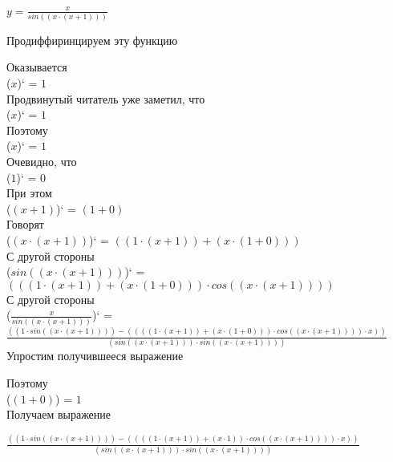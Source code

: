 \documentclass[12pt,a4paper,fleqn]{article}
\begin{document}
$y = $$\frac{x}{sin((x \cdot (x + 1)))}$

 Продиффиринцируем эту функцию

Оказывается\\
($x$)` = $1$\\
Продвинутый читатель уже заметил, что\\
($x$)` = $1$\\
Поэтому\\
($x$)` = $1$\\
Очевидно, что\\
($1$)` = $0$\\
При этом\\
($(x + 1)$)` = $(1 + 0)$\\
Говорят\\
($(x \cdot (x + 1))$)` = $((1 \cdot (x + 1)) + (x \cdot (1 + 0)))$\\
С другой стороны\\
($sin((x \cdot (x + 1)))$)` = $(((1 \cdot (x + 1)) + (x \cdot (1 + 0))) \cdot cos((x \cdot (x + 1))))$\\
С другой стороны\\
($\frac{x}{sin((x \cdot (x + 1)))}$)` = $\frac{((1 \cdot sin((x \cdot (x + 1)))) - ((((1 \cdot (x + 1)) + (x \cdot (1 + 0))) \cdot cos((x \cdot (x + 1)))) \cdot x))}{(sin((x \cdot (x + 1))) \cdot sin((x \cdot (x + 1))))}$\\


Упростим получившееся выражение

Поэтому\\
($(1 + 0)$) = $1$\\


 Получаем выражение

$\frac{((1 \cdot sin((x \cdot (x + 1)))) - ((((1 \cdot (x + 1)) + (x \cdot 1)) \cdot cos((x \cdot (x + 1)))) \cdot x))}{(sin((x \cdot (x + 1))) \cdot sin((x \cdot (x + 1))))}$
\end{document}
